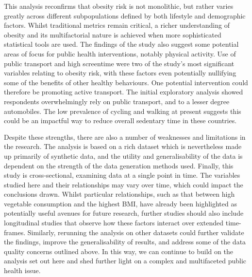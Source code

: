 This analysis reconfirms that obesity risk is not monolithic, but rather varies greatly across different subpopulations defined by both lifestyle and demographic factors. Whilst traditional metrics remain critical, a richer understanding of obesity and its multifactorial nature is achieved when more sophisticated statistical tools are used. The findings of the study also suggest some potential areas of focus for public health interventions, notably physical activity. Use of public transport and high screentime were two of the study's most significant variables relating to obesity risk, with these factors even potentially nullifying some of the benefits of other healthy behaviours. One potential intervention could therefore be promoting active transport. The initial exploratory analysis showed respondents overwhelmingly rely on public transport, and to a lesser degree automobiles. The low prevalence of cycling and walking at present suggests this could be an impactful way to reduce overall sedentary time in these countries. 

Despite these strengths, there are also a number of weaknesses and limitations in the research. The analysis is based on a rich dataset which is nevertheless made up primarily of synthetic data, and the utility and generalisability of the data is dependent on the strength of the data generation methods used. Finally, this study is cross-sectional, examining data at a single point in time. The variables studied here and their relationships may vary over time, which could impact the conclusions drawn. Whilst particular relationships, such as that between high vegetable consumption and the highest BMI, have already been highlighted as potentially useful avenues for future research, further studies should also include longitudinal studies that observe how these factors interact over extended time-frames. Similarly, rerunning the analysis on other datasets could further validate the findings, improve the generalisability of results, and address some of the data quality concerns outlined above. In this way, we can continue to build on the analysis set out here and shed further light on a complex and multifaceted public health issue. 
